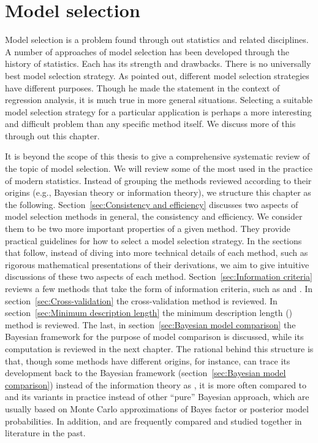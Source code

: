 \chapter{Model selection}
\label{cha:Model selection}

Model selection is a problem found through out statistics and related
disciplines. A number of approaches of model selection has been developed
through the history of statistics. Each has its strength and drawbacks. There
is no universally best model selection strategy. As
\cite[][chap.~4]{Myers:1990wt} pointed out, different model selection
strategies have different purposes. Though he made the statement in the
context of regression analysis, it is much true in more general situations.
Selecting a suitable model selection strategy for a particular application is
perhaps a more interesting and difficult problem than any specific method
itself. We discuss more of this through out this chapter.

It is beyond the scope of this thesis to give a comprehensive systematic
review of the topic of model selection. We will review some of the most used
in the practice of modern statistics. Instead of grouping the methods reviewed
according to their origins (e.g., Bayesian theory or information theory), we
structure this chapter as the following. Section~\ref{sec:Consistency and
  efficiency} discusses two aspects of model selection methods in general, the
consistency and efficiency. We consider them to be two more important
properties of a given method. They provide practical guidelines for how to
select a model selection strategy. In the sections that follow, instead of
diving into more technical details of each method, such as rigorous
mathematical presentations of their derivations, we aim to give intuitive
discussions of these two aspects of each method. Section~\ref{sec:Information
  criteria} reviews a few methods that take the form of information criteria,
such as \aic and \bic. In section~\ref{sec:Cross-validation} the
cross-validation method is reviewed. In section~\ref{sec:Minimum description
  length} the minimum description length (\mdl) method is reviewed. The last,
in section~\ref{sec:Bayesian model comparison} the Bayesian framework for the
purpose of model comparison is discussed, while its computation is reviewed in
the next chapter. The rational behind this structure is that, though some
methods have different origins, for instance, \bic can trace its development
back to the Bayesian framework (section~\ref{sec:Bayesian model comparison})
instead of the information theory as \aic, it is more often compared to
\aic and its variants in practice instead of other ``pure'' Bayesian approach,
which are usually based on Monte Carlo approximations of Bayes factor or
posterior model probabilities. In addition, \aic and \bic are frequently
compared and studied together in literature in the past.

